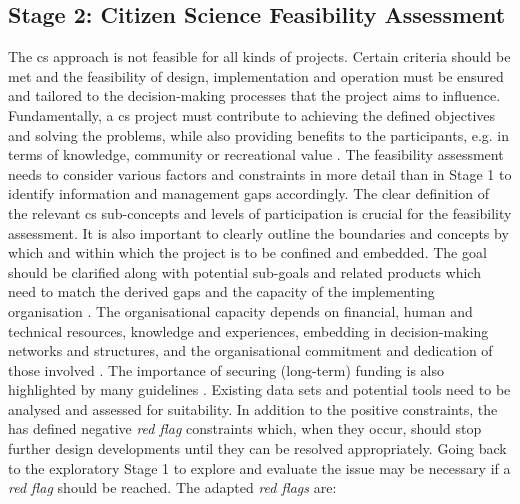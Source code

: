 \subsection{Stage 2: Citizen Science Feasibility Assessment}\label{subsec:stage2_design}

The \acrlong{cs} approach is not feasible for all kinds of projects. Certain criteria should be met and the feasibility of design, implementation and operation must be ensured and tailored to the decision-making processes that the project aims to influence. Fundamentally, a \acrshort{cs} project must contribute to achieving the defined objectives and solving the problems, while also providing benefits to the participants, e.g. in terms of knowledge, community or recreational value \autocite{escaTenPrinciplesCitizen2015}. The feasibility assessment needs to consider various factors and constraints in more detail than in Stage 1 to identify information and management gaps accordingly. The clear definition of the relevant \acrshort{cs} sub-concepts and levels of participation is crucial for the feasibility assessment. It is also important to clearly outline the boundaries and concepts by which and within which the project is to be confined and embedded. The goal should be clarified along with potential sub-goals and related products which need to match the derived gaps and the capacity of the implementing organisation \autocite{ifrcCommunityBasedSurveillanceGuiding2017,minkmanCitizenScienceWater2015}. The organisational capacity depends on financial, human and technical resources, knowledge and experiences, embedding in decision-making networks and structures, and the organisational commitment and dedication of those involved \autocite{fraislCitizenScienceEnvironmental2022,ifrcCommunityBasedSurveillanceGuiding2017}. The importance of securing (long-term) funding is also highlighted by many guidelines \autocite{cervoniImplementingIntegratedWater2008,minkmanCitizenScienceWater2015,sharpeCommunityBasedEcological2006, whitelawEstablishingCanadianCommunity2003}. Existing data sets and potential tools need to be analysed and assessed for suitability. In addition to the positive constraints, the \textcite{ifrcCommunityBasedSurveillanceGuiding2017} has defined negative \textit{red flag} constraints which, when they occur, should stop further design developments until they can be resolved appropriately. Going back to the exploratory Stage 1 to explore and evaluate the issue may be necessary if a \textit{red flag} should be reached. The adapted \textit{red flags} are:

